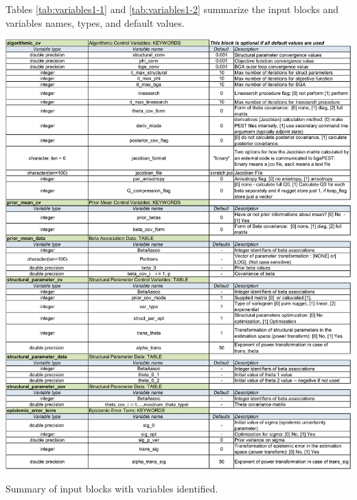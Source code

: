 \documentclass[11pt,oneside,onecolumn]{usgsreport}
\begin{document}
\begin{appendix}
Tables \ref{tab:variables1-1} and \ref{tab:variables1-2} summarize the input blocks and variables
names, types, and default values.

\begin{table}[!t]
\begin{center}\includegraphics[scale=0.5]{Variables_for_documentation1}\end{center}

\caption{\label{tab:variables1-1}Summary of input blocks with variables identified.}
\end{table}



\end{appendix}
\end{document}
